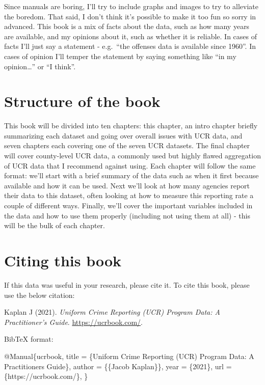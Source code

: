 \documentclass[
  12pt,
  openany]{book}
\newenvironment{Shaded}{\begin{snugshade}}{\end{snugshade}}
\newcommand{\DataTypeTok}[1]{\textcolor[rgb]{0.13,0.29,0.53}{#1}}
\newcommand{\NormalTok}[1]{#1}
\newcommand{\OtherTok}[1]{\textcolor[rgb]{0.56,0.35,0.01}{#1}}
\newcommand{\VariableTok}[1]{\textcolor[rgb]{0.00,0.00,0.00}{#1}}
\begin{document}
Since manuals are boring, I'll try to include graphs and images to try to alleviate the boredom. That said, I don't think it's possible to make it too fun so sorry in advanced. This book is a mix of facts about the data, such as how many years are available, and my opinions about it, such as whether it is reliable. In cases of facts I'll just say a statement - e.g.~``the offenses data is available since 1960''. In cases of opinion I'll temper the statement by saying something like ``in my opinion\ldots{}'' or ``I think''.

\hypertarget{structure-of-the-book}{%
\section{Structure of the book}\label{structure-of-the-book}}

This book will be divided into ten chapters: this chapter, an intro chapter briefly summarizing each dataset and going over overall issues with UCR data, and seven chapters each covering one of the seven UCR datasets. The final chapter will cover county-level UCR data, a commonly used but highly flawed aggregation of UCR data that I recommend against using. Each chapter will follow the same format: we'll start with a brief summary of the data such as when it first because available and how it can be used. Next we'll look at how many agencies report their data to this dataset, often looking at how to measure this reporting rate a couple of different ways. Finally, we'll cover the important variables included in the data and how to use them properly (including not using them at all) - this will be the bulk of each chapter.

\hypertarget{citing-this-book}{%
\section{Citing this book}\label{citing-this-book}}

If this data was useful in your research, please cite it. To cite this book, please use the below citation:

Kaplan J (2021). \emph{Uniform Crime Reporting (UCR) Program Data: A Practitioner's Guide}. \url{https://ucrbook.com/}.

BibTeX format:

\begin{Shaded}
\begin{Highlighting}[]
\VariableTok{@Manual}\NormalTok{\{}\OtherTok{ucrbook}\NormalTok{,}
  \DataTypeTok{title}\NormalTok{ = \{Uniform Crime Reporting (UCR) Program Data: A Practitioner\textquotesingle{}s Guide\},}
  \DataTypeTok{author}\NormalTok{ = \{\{Jacob Kaplan\}\},}
  \DataTypeTok{year}\NormalTok{ = \{2021\},}
  \DataTypeTok{url}\NormalTok{ = \{https://ucrbook.com/\},}
\NormalTok{\}}
\end{Highlighting}
\end{Shaded}
\end{document}
